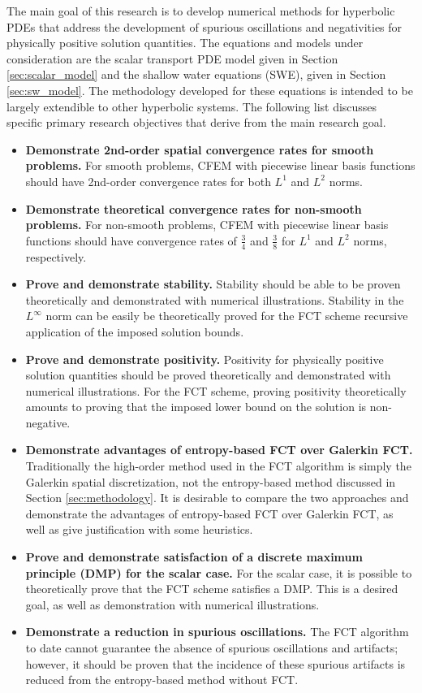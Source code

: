 The main goal of this research is to develop numerical methods for hyperbolic
PDEs that address the development of spurious oscillations and negativities
for physically positive solution quantities. The equations and models under
consideration are the scalar transport PDE model given in Section \ref{sec:scalar_model}
and the shallow water equations (SWE), given in Section \ref{sec:sw_model}.
The methodology developed for these equations is intended to be largely
extendible to other hyperbolic systems. The following list discusses specific
primary research objectives that derive from the main research goal.

\begin{itemize}
  \item \textbf{Demonstrate 2nd-order spatial convergence rates for smooth problems.}
    For smooth problems, CFEM with piecewise linear basis functions should
    have 2nd-order convergence rates for both $L^1$ and $L^2$ norms.
  \item \textbf{Demonstrate theoretical convergence rates for non-smooth problems.}
    For non-smooth problems, CFEM with piecewise linear basis functions should
    have convergence rates of $\frac{3}{4}$ and $\frac{3}{8}$ for $L^1$ and $L^2$
    norms, respectively.
  \item \textbf{Prove and demonstrate stability.}
    Stability should be able to be proven theoretically and demonstrated with
    numerical illustrations. Stability in the $L^\infty$ norm can be easily
    be theoretically proved for the FCT scheme recursive application of the
    imposed solution bounds.
  \item \textbf{Prove and demonstrate positivity.}
    Positivity for physically positive solution quantities should be proved
    theoretically and demonstrated with numerical illustrations. For the FCT
    scheme, proving positivity theoretically amounts to proving that the
    imposed lower bound on the solution is non-negative.
  \item \textbf{Demonstrate advantages of entropy-based FCT over Galerkin FCT.}
    Traditionally the high-order method used in the FCT algorithm is simply the
    Galerkin spatial discretization, not the entropy-based method discussed in
    Section \ref{sec:methodology}. It is desirable to compare the two approaches
    and demonstrate the advantages of entropy-based FCT over Galerkin FCT, as
    well as give justification with some heuristics.
  \item \textbf{Prove and demonstrate satisfaction of a discrete maximum
    principle (DMP) for the scalar case.}
    For the scalar case, it is possible to theoretically prove that the FCT
    scheme satisfies a DMP. This is a desired goal, as well as demonstration
    with numerical illustrations.
  \item \textbf{Demonstrate a reduction in spurious oscillations.}
    The FCT algorithm to date cannot guarantee the absence of spurious
    oscillations and artifacts; however, it should be proven that the incidence
    of these spurious artifacts is reduced from the entropy-based method
    without FCT.
\end{itemize}
  
